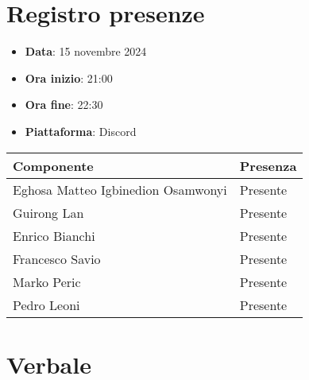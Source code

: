 \documentclass[a4paper, 12pt]{article}
\def\data-verbale{15 novembre 2024}
\begin{document}
\section{Registro presenze}
\begin{itemize}
    \item[] \textbf{Data}: \data-verbale
    \item[] \textbf{Ora inizio}:  21:00
    \item[] \textbf{Ora fine}: 22:30
    \item[] \textbf{Piattaforma}: Discord	
\end{itemize}
\begin{table}[!h]
\centering
{\renewcommand{\arraystretch}{2}
\begin{tabularx}{\textwidth}{| X | X |}
    \hline
        \textbf{\large Componente} & 
        \textbf{\large Presenza} \\ 
    \hline 
    \hline
        Eghosa Matteo Igbinedion Osamwonyi&
        Presente \\
    \hline 
        Guirong Lan&
        Presente \\
    \hline 
        Enrico Bianchi&
        Presente \\
    \hline 
        Francesco Savio&
        Presente \\
    \hline 
        Marko Peric&
        Presente \\
    \hline 
        Pedro Leoni&
        Presente \\
    \hline 

\end{tabularx}}
\end{table}

\newpage

\section{Verbale}
\end{document}
